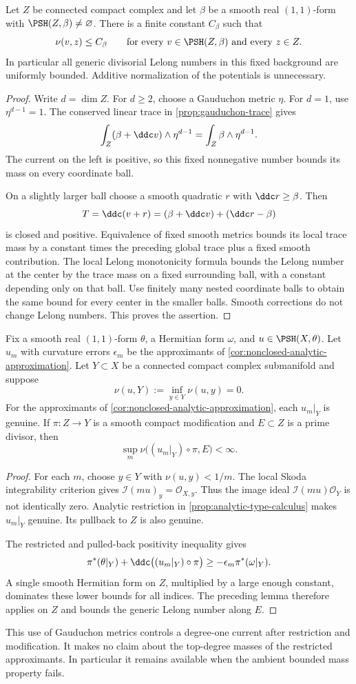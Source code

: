 \begin{lemma}\label{lem:gauduchon-uniform-lelong}
Let $Z$ be connected compact complex and let $\beta$ be a smooth real $(1,1)$-form with $\PSH(Z,\beta)\ne\varnothing$. There is a finite constant $C_\beta$ such that
\[
 \nu(v,z)\leq C_\beta\qquad
 \text{for every }v\in\PSH(Z,\beta)\text{ and every }z\in Z.
\]
In particular all generic divisorial Lelong numbers in this fixed background are uniformly bounded. Additive normalization of the potentials is unnecessary.
\end{lemma}
\begin{proof}
Write $d=\dim Z$. For $d\geq2$, choose a Gauduchon metric $\eta$. For $d=1$, use $\eta^{d-1}=1$. The conserved linear trace in \cref{prop:gauduchon-trace} gives
\[
 \int_Z(\beta+\ddc v)\wedge\eta^{d-1}
 =\int_Z\beta\wedge\eta^{d-1}.
\]
The current on the left is positive, so this fixed nonnegative number bounds its mass on every coordinate ball.

On a slightly larger ball choose a smooth quadratic $r$ with $\ddc r\geq\beta$. Then
\[
 T=\ddc(v+r)=(\beta+\ddc v)+(\ddc r-\beta)
\]
is closed and positive. Equivalence of fixed smooth metrics bounds its local trace mass by a constant times the preceding global trace plus a fixed smooth contribution. The local Lelong monotonicity formula bounds the Lelong number at the center by the trace mass on a fixed surrounding ball, with a constant depending only on that ball. Use finitely many nested coordinate balls to obtain the same bound for every center in the smaller balls. Smooth corrections do not change Lelong numbers. This proves the assertion.
\end{proof}

\begin{corollary}\label{cor:restricted-analytic-divisorial-bound}
Fix a smooth real $(1,1)$-form $\theta$, a Hermitian form $\omega$, and $u\in\PSH(X,\theta)$. Let $u_m$ with curvature errors $\epsilon_m$ be the approximants of \cref{cor:nonclosed-analytic-approximation}. Let $Y\subset X$ be a connected compact complex submanifold and suppose
\[
 \nu(u,Y):=\inf_{y\in Y}\nu(u,y)=0.
\]
For the approximants of \cref{cor:nonclosed-analytic-approximation}, each $u_m|_Y$ is genuine. If $\pi:Z\to Y$ is a smooth compact modification and $E\subset Z$ is a prime divisor, then
\[
 \sup_m\nu\bigl((u_m|_Y)\circ\pi,E\bigr)<\infty.
\]
\end{corollary}
\begin{proof}
For each $m$, choose $y\in Y$ with $\nu(u,y)<1/m$. The local Skoda integrability criterion gives $\mathcal I(mu)_y=\mathcal O_{X,y}$. Thus the image ideal $\mathcal I(mu)\mathcal O_Y$ is not identically zero. Analytic restriction in \cref{prop:analytic-type-calculus} makes $u_m|_Y$ genuine. Its pullback to $Z$ is also genuine.

The restricted and pulled-back positivity inequality gives
\[
 \pi^*(\theta|_Y)+\ddc\bigl((u_m|_Y)\circ\pi\bigr)
 \geq-\epsilon_m\pi^*(\omega|_Y).
\]
A single smooth Hermitian form on $Z$, multiplied by a large enough constant, dominates these lower bounds for all indices. The preceding lemma therefore applies on $Z$ and bounds the generic Lelong number along $E$.
\end{proof}

This use of Gauduchon metrics controls a degree-one current after restriction and modification. It makes no claim about the top-degree masses of the restricted approximants. In particular it remains available when the ambient bounded mass property fails.
